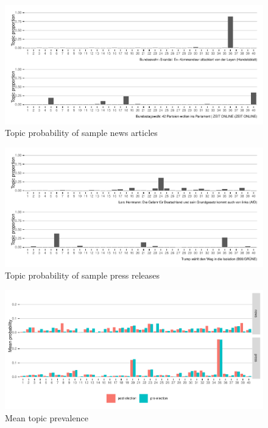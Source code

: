 \documentclass[
]{article}
\begin{document}
\begin{figure}

{\centering \includegraphics[width=0.8\linewidth]{main_text_files/figure-latex/News articles sample documents-1} 

}

\caption{Topic probability of sample news articles \label{fig:sample_docs12}}\label{fig:News articles sample documents}
\end{figure}

\begin{figure}

{\centering \includegraphics[width=0.8\linewidth]{main_text_files/figure-latex/Press releases sample documents-1} 

}

\caption{Topic probability of sample press releases \label{fig:sample_docs34}}\label{fig:Press releases sample documents}
\end{figure}

\begin{figure}

{\centering \includegraphics[width=0.8\linewidth]{main_text_files/figure-latex/Mean topic prevalence-1} 

}

\caption{Mean topic prevalence \label{fig:mean_theta}}\label{fig:Mean topic prevalence}
\end{figure}
\end{document}
